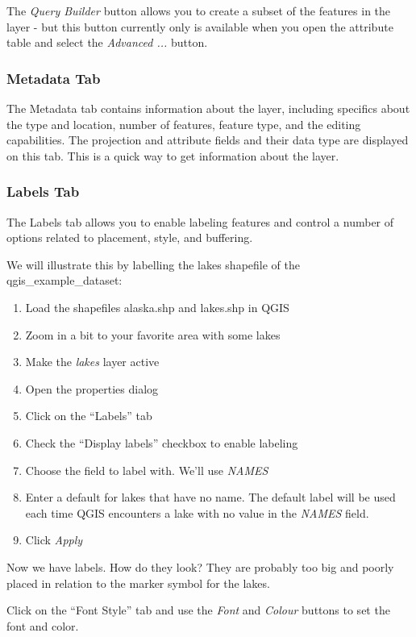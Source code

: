 The \textsl{Query Builder} button allows you to create a subset of the features 
in the layer - but this button currently only is available when you open the 
attribute table and select the \textsl{Advanced ...} button.

\subsubsection{Metadata Tab}

The Metadata tab contains information about the layer, including specifics
about the type and location, number of features, feature type, and the editing
capabilities. The projection and attribute fields and their data type are displayed 
on this tab. This is a quick way to get information about the layer.

\subsubsection{Labels Tab}

The Labels tab allows you to enable labeling features and control a number of
options related to placement, style, and buffering. 

We will illustrate this by labelling the lakes shapefile of the qgis\_example\_dataset:

\begin{enumerate}
\item Load the shapefiles alaska.shp and lakes.shp in QGIS 
\item Zoom in a bit to your favorite area with some lakes
\item Make the \textsl{lakes} layer active
\item Open the properties dialog
\item Click on the ``Labels'' tab
\item Check the ``Display labels'' checkbox to enable labeling
\item Choose the field to label with. We'll use \textsl{NAMES}
\item Enter a default for lakes that have no name. The default label will be
  used each time QGIS encounters a lake with no value in the \textsl{NAMES} field.
\item Click \textsl{Apply}
\end{enumerate} 

Now we have labels. How do they look? They are probably too big and poorly
placed in relation to the marker symbol for the lakes.

Click on the ``Font Style'' tab and use the \textsl{Font} and \textsl{Colour}
buttons to set the font and color. 

